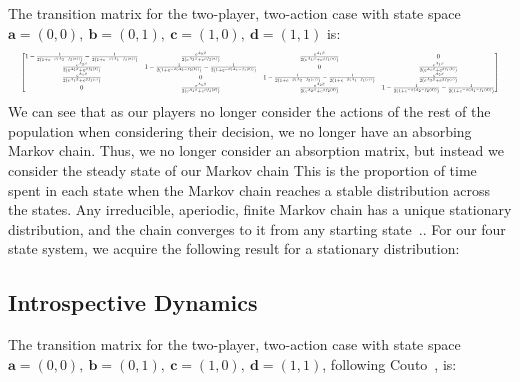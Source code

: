 \documentclass{article}
\begin{document}
The transition matrix for the two-player, two-action case with state space
\(\mathbf{a} = (0,0),\ \mathbf{b} = (0,1),\ \mathbf{c} = (1,0),\ \mathbf{d} = (1,1)\) is:
\begin{equation}
\resizebox{\textwidth}{!}{
$
\begin{bmatrix}
1-\frac{1}{2(1+e^{-\beta(A_2-f_2(a))})}-\frac{1}{2(1+e^{-\beta(A_1-f_1(a))})} &
\frac{e^{A_2\beta}}{2(e^{A_2\beta}+e^{\beta f_2(a)})} &
\frac{e^{A_1\beta}}{2(e^{A_1\beta}+e^{\beta f_1(a)})} &
0 \\

\frac{e^{A_2\beta}}{2(e^{A_2\beta}+e^{\beta f_2(b)})} &
1-\frac{1}{2(1+e^{-\beta(A_2-f_2(b))})}-\frac{1}{2(1+e^{-\beta(A_1-f_1(b))})} &
0 &
\frac{e^{A_1\beta}}{2(e^{A_1\beta}+e^{\beta f_1(b)})} \\

\frac{e^{A_1\beta}}{2(e^{A_1\beta}+e^{\beta f_1(c)})} &
0 &
1-\frac{1}{2(1+e^{-\beta(A_2-f_2(c))})}-\frac{1}{2(1+e^{-\beta(A_1-f_1(c))})} &
\frac{e^{A_2\beta}}{2(e^{A_2\beta}+e^{\beta f_2(c)})} \\

0 &
\frac{e^{A_1\beta}}{2(e^{A_1\beta}+e^{\beta f_1(d)})} &
\frac{e^{A_2\beta}}{2(e^{A_2\beta}+e^{\beta f_2(d)})} &
1-\frac{1}{2(1+e^{-\beta(A_2-f_2(d))})}-\frac{1}{2(1+e^{-\beta(A_1-f_1(d))})}
\end{bmatrix}
$
}
\label{eqn:2x2_Aspiration_Transition}
\end{equation}
We can see that as our players no longer consider the actions of the rest of
the population when considering their decision, we no longer have an absorbing
Markov chain.
Thus, we no longer consider an absorption matrix, but instead we consider the
steady state of our Markov chain \cite{f66ea2a5-f1c3-3855-8dc0-e3047d83298e}
This is the proportion of time spent in each state when the Markov chain
reaches a stable distribution across the states.
Any irreducible, aperiodic, finite Markov chain has a unique stationary
distribution, and the chain converges to it from any starting
state~\cite{levin2017markov}..
For our four state system, we acquire the following result for a stationary
distribution:


\subsection*{Introspective Dynamics}

The transition matrix for the two-player, two-action case with state space
\(\mathbf{a} = (0,0),\ \mathbf{b} = (0,1),\ \mathbf{c} = (1,0),\ \mathbf{d} = (1,1)\),
following Couto~\cite{Couto2022}, is:
\end{document}
